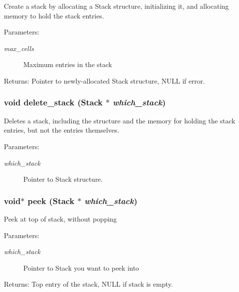 Create a stack by allocating a Stack structure, initializing it, and allocating memory to hold the stack entries. \begin{Desc}
\item[Parameters:]
\begin{description}
\item[{\em max\_\-cells}]Maximum entries in the stack \end{description}
\end{Desc}
\begin{Desc}
\item[Returns:]Pointer to newly-allocated Stack structure, NULL if error. \end{Desc}
\subsubsection{\setlength{\rightskip}{0pt plus 5cm}void delete\_\-stack (\bf{Stack} $\ast$ {\em which\_\-stack})}\label{stack_8c_51a8e7dcd59c4eeacab0a6fcbd9779f0}


Deletes a stack, including the structure and the memory for holding the stack entries, but not the entries themselves. \begin{Desc}
\item[Parameters:]
\begin{description}
\item[{\em which\_\-stack}]Pointer to Stack structure. \end{description}
\end{Desc}
\subsubsection{\setlength{\rightskip}{0pt plus 5cm}void$\ast$ peek (\bf{Stack} $\ast$ {\em which\_\-stack})}\label{stack_8c_75f168a88a2f0eb5054b9eb571b3dd77}


Peek at top of stack, without popping \begin{Desc}
\item[Parameters:]
\begin{description}
\item[{\em which\_\-stack}]Pointer to Stack you want to peek into \end{description}
\end{Desc}
\begin{Desc}
\item[Returns:]Top entry of the stack, NULL if stack is empty. \end{Desc}
